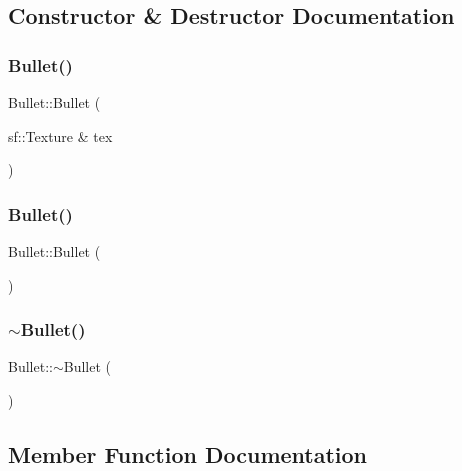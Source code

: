 \subsection{Constructor \& Destructor Documentation}
\mbox{\label{class_bullet_aa63b471d62d662e9015d18c7c7972db0}} 
\subsubsection{\texorpdfstring{Bullet()}{Bullet()}\hspace{0.1cm}{\footnotesize\ttfamily [1/2]}}
{\footnotesize\ttfamily Bullet\+::\+Bullet (\begin{DoxyParamCaption}\item[{sf\+::\+Texture \&}]{tex }\end{DoxyParamCaption})}

\mbox{\label{class_bullet_acd7befc0bc18907cc1d871d37bbdddeb}} 
\subsubsection{\texorpdfstring{Bullet()}{Bullet()}\hspace{0.1cm}{\footnotesize\ttfamily [2/2]}}
{\footnotesize\ttfamily Bullet\+::\+Bullet (\begin{DoxyParamCaption}{ }\end{DoxyParamCaption})}

\mbox{\label{class_bullet_aaeb5cb41d7db89f49007b08b41f1bfcf}} 
\subsubsection{\texorpdfstring{$\sim$\+Bullet()}{~Bullet()}}
{\footnotesize\ttfamily Bullet\+::$\sim$\+Bullet (\begin{DoxyParamCaption}{ }\end{DoxyParamCaption})}



\subsection{Member Function Documentation}
\mbox{\label{class_bullet_a49da1f5862bcb89f36588ead6e620c06}} 
